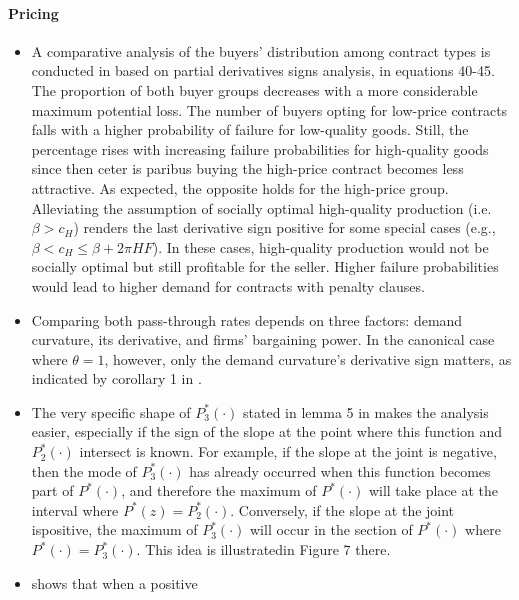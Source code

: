 \documentclass[11pt]{book}
\begin{document}
\paragraph{Pricing}
\begin{itemize}
\item A comparative analysis of the buyers\textquoteright{} distribution
among contract types is conducted in \cite{noll2004optimal}
based on partial derivatives signs analysis, in equations 40-45. The
proportion of both buyer groups decreases with a more considerable
maximum potential loss. The number of buyers opting for low-price
contracts falls with a higher probability of failure for low-quality
goods. Still, the percentage rises with increasing failure probabilities
for high-quality goods since then ceter is paribus buying the high-price
contract becomes less attractive. As expected, the opposite holds
for the high-price group. Alleviating the assumption of socially optimal
high-quality production (i.e. $\beta>c_{H}$) renders the last derivative
sign positive for some special cases (e.g., $\beta<c_{H}\leq\beta+2\pi HF$).
In these cases, high-quality production would not be socially optimal
but still profitable for the seller. Higher failure probabilities
would lead to higher demand for contracts with penalty clauses.
\item Comparing both pass-through rates depends on three factors: demand
curvature, its derivative, and firms' bargaining power. In the canonical
case where $\theta=1$, however, only the demand curvature's derivative
sign matters, as indicated by corollary 1 in \cite{gaudin2016pass}.
\item The very specific shape of $P_{3}^{*}\left(\cdot\right)$ stated in
lemma 5 in \cite{rubio2018unimodality}
makes the analysis easier, especially if the sign of the slope at
the point where this function and $P_{2}^{*}\left(\cdot\right)$ intersect
is known. For example, if the slope at the joint is negative, then
the mode of $P_{3}^{*}\left(\cdot\right)$ has already occurred when
this function becomes part of $P^{*}\left(\cdot\right)$, and therefore
the maximum of $P^{*}\left(\cdot\right)$ will take place at the interval
where $P^{*}\left(z\right)=P_{2}^{*}\left(\cdot\right)$. Conversely,
if the slope at the joint ispositive, the maximum of $P_{3}^{*}\left(\cdot\right)$
will occur in the section of $P^{*}\left(\cdot\right)$ where $P^{*}\left(\cdot\right)=P_{3}^{*}\left(\cdot\right)$.
This idea is illustratedin Figure 7 there.
\item \cite{diep2021cross} shows that when a positive

\end{itemize}
\end{document}
